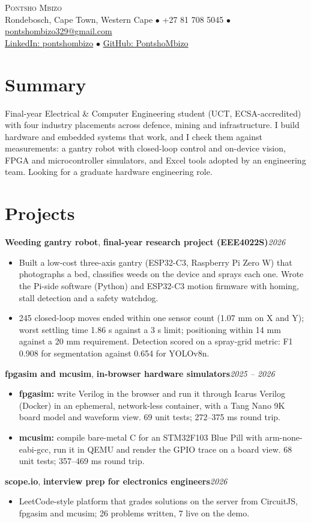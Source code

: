 \documentclass[10pt,a4paper]{article}
\newcommand{\role}[3]{\textbf{#1}, \textbf{#2}\hfill\textit{#3}\par\vspace{-1pt}}
\begin{document}
\begin{center}
{\color{accent}\LARGE\scshape Pontsho Mbizo}\\[3pt]
{\small Rondebosch, Cape Town, Western Cape $\bullet$ +27 81 708 5045 $\bullet$ \href{mailto:pontshombizo329@gmail.com}{pontshombizo329@gmail.com}\\
\href{https://www.linkedin.com/in/pontshombizo}{LinkedIn: pontshombizo} $\bullet$ \href{https://github.com/PontshoMbizo}{GitHub: PontshoMbizo}}
\end{center}
\vspace{-6pt}
\section*{Summary}
Final-year Electrical \& Computer Engineering student (UCT, ECSA-accredited) with four industry placements across defence, mining and infrastructure. I build hardware and embedded systems that work, and I check them against measurements: a gantry robot with closed-loop control and on-device vision, FPGA and microcontroller simulators, and Excel tools adopted by an engineering team. Looking for a graduate hardware engineering role.

\section*{Projects}
\role{Weeding gantry robot}{final-year research project (EEE4022S)}{2026}
\begin{itemize}
\item Built a low-cost three-axis gantry (ESP32-C3, Raspberry Pi Zero W) that photographs a bed, classifies weeds on the device and sprays each one. Wrote the Pi-side software (Python) and ESP32-C3 motion firmware with homing, stall detection and a safety watchdog.
\item 245 closed-loop moves ended within one sensor count (1.07 mm on X and Y); worst settling time 1.86 s against a 3 s limit; positioning within 14 mm against a 20 mm requirement. Detection scored on a spray-grid metric: F1 0.908 for segmentation against 0.654 for YOLOv8n.
\end{itemize}
\role{fpgasim and mcusim}{in-browser hardware simulators}{2025 -- 2026}
\begin{itemize}
\item \textbf{fpgasim:} write Verilog in the browser and run it through Icarus Verilog (Docker) in an ephemeral, network-less container, with a Tang Nano 9K board model and waveform view. 69 unit tests; 272--375 ms round trip.
\item \textbf{mcusim:} compile bare-metal C for an STM32F103 Blue Pill with arm-none-eabi-gcc, run it in QEMU and render the GPIO trace on a board view. 68 unit tests; 357--469 ms round trip.
\end{itemize}
\role{scope.io}{interview prep for electronics engineers}{2026}
\begin{itemize}
\item LeetCode-style platform that grades solutions on the server from CircuitJS, fpgasim and mcusim; 26 problems written, 7 live on the demo.
\end{itemize}
\end{document}

